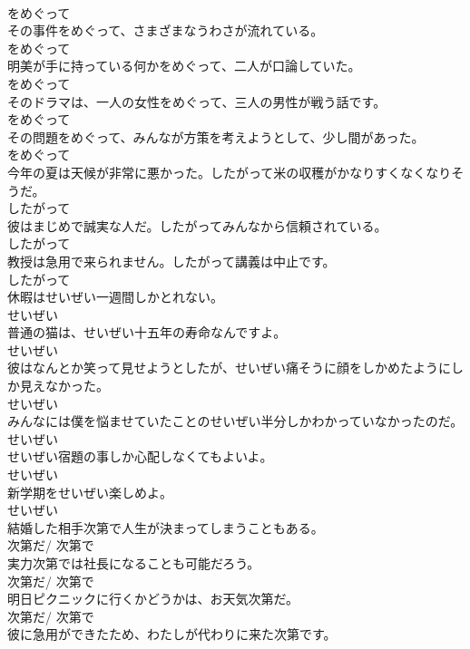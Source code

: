 \documentclass[8pt]{extreport}
\begin{document}
\begin{CJK}{UTF8}{min}
\\	をめぐって	
\\	その事件をめぐって、さまざまなうわさが流れている。	
\\	をめぐって	
\\	明美が手に持っている何かをめぐって、二人が口論していた。	
\\	をめぐって	
\\	そのドラマは、一人の女性をめぐって、三人の男性が戦う話です。	
\\	をめぐって	
\\	その問題をめぐって、みんなが方策を考えようとして、少し間があった。	
\\	をめぐって	
\\	今年の夏は天候が非常に悪かった。したがって米の収穫がかなりすくなくなりそうだ。	
\\	したがって	
\\	彼はまじめで誠実な人だ。したがってみんなから信頼されている。	
\\	したがって	
\\	教授は急用で来られません。したがって講義は中止です。	
\\	したがって	
\\	休暇はせいぜい一週間しかとれない。	
\\	せいぜい	
\\	普通の猫は、せいぜい十五年の寿命なんですよ。	
\\	せいぜい	
\\	彼はなんとか笑って見せようとしたが、せいぜい痛そうに顔をしかめたようにしか見えなかった。	
\\	せいぜい	
\\	みんなには僕を悩ませていたことのせいぜい半分しかわかっていなかったのだ。	
\\	せいぜい	
\\	せいぜい宿題の事しか心配しなくてもよいよ。	
\\	せいぜい	
\\	新学期をせいぜい楽しめよ。	
\\	せいぜい	
\\	結婚した相手次第で人生が決まってしまうこともある。	
\\	次第だ/ 次第で	
\\	実力次第では社長になることも可能だろう。	
\\	次第だ/ 次第で	
\\	明日ピクニックに行くかどうかは、お天気次第だ。	
\\	次第だ/ 次第で	
\\	彼に急用ができたため、わたしが代わりに来た次第です。	

\end{CJK}
\end{document}
